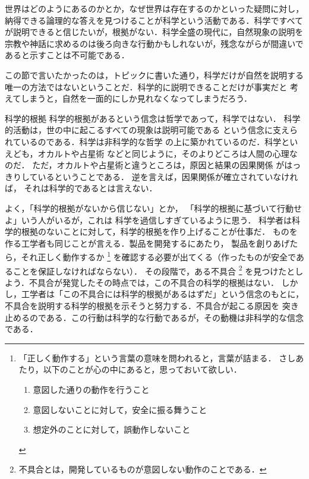             世界はどのようにあるのかとか，なぜ世界は存在するのかといった疑問に対し，
            納得できる論理的な答えを見つけることが科学という活動である．科学ですべて
            が説明できると信じたいが，根拠がない．科学全盛の現代に，自然現象の説明を
            宗教や神話に求めるのは後ろ向きな行動かもしれないが，残念ながらが間違いで
            あると示すことは不可能である．

            この節で言いたかったのは，トピックに書いた通り，科学だけが自然を説明する
            唯一の方法ではないということだ．科学的に説明できることだけが事実だと
            考えてしまうと，自然を一面的にしか見れなくなってしまうだろう．

            \begin{memo}{科学的根拠}
                科学的根拠があるという信念は哲学であって，科学ではない．
                科学的活動は，世の中に起こるすべての現象は説明可能である
                という信念に支えられているのである．科学は非科学的な哲学
                の上に築かれているのだ．科学といえども，オカルトや占星術
                などと同じように，そのよりどころは人間の心理なのだ．
                ただ，オカルトや占星術と違うところは，原因と結果の因果関係
                がはっきりしているということである．
                逆を言えば，因果関係が確立されていなければ，
                それは科学的であるとは言えない．

                よく，「科学的根拠がないから信じない」とか，
                「科学的根拠に基づいて行動せよ」いう人がいるが，これは
                科学を過信しすぎているように思う．
                科学者は科学的根拠のないことに対して，科学的根拠を作り上げることが仕事だ．
                ものを作る工学者も同じことが言える．製品を開発するにあたり，
                製品を創りあげたら，それ正しく動作するか
                    \footnote{
                        「正しく動作する」という言葉の意味を問われると，言葉が詰まる．
                        さしあたり，以下のことが心の中にあると，思っておいて欲しい．
                        \begin{enumerate}
                           \item 意図した通りの動作を行うこと
                           \item 意図しないことに対して，安全に振る舞うこと
                           \item 想定外のことに対して，誤動作しないこと
                       \end{enumerate}
                    }
                を確認する必要が出てくる（作ったものが安全であることを保証しなければならない）．
                その段階で，ある不具合
                    \footnote{
                        不具合とは，開発しているものが意図しない動作のことである．
                    }
                を見つけたとしよう．不具合が発覚したその時点では，この不具合の科学的根拠はない．
                しかし，工学者は「この不具合には科学的根拠があるはずだ」という信念のもとに，
                不具合を説明する科学的根拠を示そうと努力する．不具合が起こる原因を
                突き止めるのである．この行動は科学的な行動であるが，その動機は非科学的な信念である．


\end{memo}
